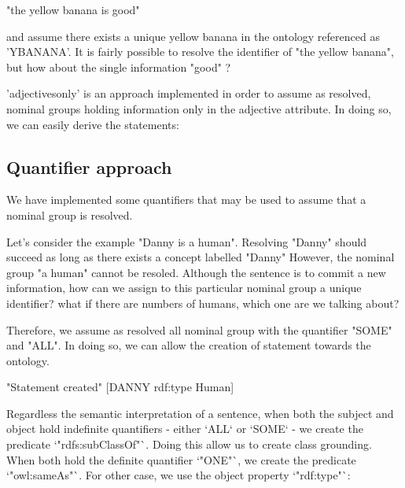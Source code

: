 \documentclass[twoside,a4paper,10pt]{report}
\newcommand{\dokutitleleveltree}[1]{\subsection{#1}}
\begin{document}
\small
\begin{verbatimtab}
  "the yellow banana is good" 
\end{verbatimtab}
\normalsize
and assume there exists a unique yellow banana in the ontology referenced as 'Y{\textunderscore}BANANA'.
It is fairly possible to resolve the identifier of "the yellow banana", but how about the single information "good" ?

'adjectives{\textunderscore}only' is an approach implemented in order to assume as resolved, nominal groups holding information only in the adjective attribute.
In doing so, we can easily derive the statements: 


\small
\begin{verbatimtab}
\end{verbatimtab}
\normalsize

\dokutitleleveltree{Quantifier approach}
\label{3c48ef2a7bfacf5e512a249e797564d3}%

We have implemented some quantifiers that may be used to assume that a nominal group is resolved.

Let's consider the example "Danny is a human". Resolving "Danny" should succeed as long as there exists a concept labelled "Danny"
However, the nominal group "a human" cannot be resoled. Although the sentence is to commit a new information, how can we assign to this particular nominal group a unique identifier? what if there are numbers of humans, which one are we talking about? 

Therefore, we assume as resolved all nominal group with the quantifier "SOME" and "ALL". In doing so, we can allow the creation of statement towards the ontology.



\small
\begin{verbatimtab}
  "Statement created"
  [DANNY rdf:type Human]
\end{verbatimtab}
\normalsize

 
Regardless the semantic interpretation of a sentence, when both the subject and object hold indefinite quantifiers - either `ALL` or `SOME` - we create the predicate `"rdfs:subClassOf"`.
Doing this allow us to create class grounding. When both hold the definite quantifier `"ONE"`, we create the predicate `"owl:sameAs"`.  For other case, we use the object property `"rdf:type"`:
\end{document}
